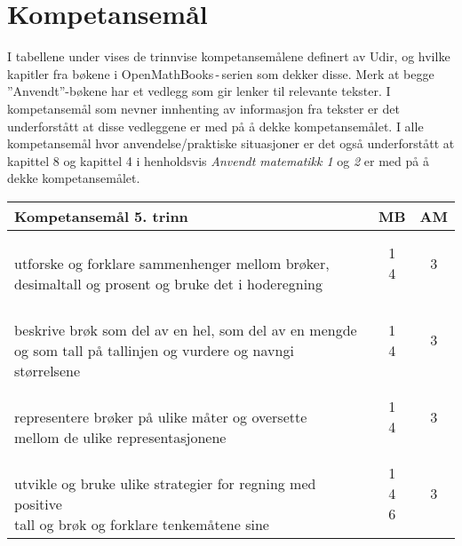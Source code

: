 \documentclass{article}
\begin{document}
\section*{Kompetansemål}
I tabellene under vises de trinnvise kompetansemålene definert av Udir, og hvilke kapitler fra bøkene i OpenMathBooks\,-\,serien som dekker disse. Merk at begge ''Anvendt''-bøkene har et vedlegg som gir lenker til relevante tekster. I kompetansemål som nevner innhenting av informasjon fra tekster er det underforstått at disse vedleggene er med på å dekke kompetansemålet. I alle kompetansemål hvor anvendelse/praktiske situasjoner er det også underforstått at kapittel 8 og kapittel 4 i henholdsvis \textsl{Anvendt matematikk 1} og \textsl{2} er med på å dekke kompetansemålet.
\newpage
\begin{center}
	\begin{tabular}{p{10.5cm} | c | c |} 
	\textbf{Kompetansemål 5. trinn} & \textbf{MB} & \textbf{AM}\\ \hline
\shortstack[l]{\\utforske og forklare sammenhenger mellom brøker,\\ desimaltall og prosent og bruke det i hoderegning} &\shortstack{1 \\4} &\shortstack{3\\{}} \\ \hline
	
\shortstack[l]{\\beskrive brøk som del av en hel, som del av en mengde\\ og som tall på tallinjen og vurdere og navngi størrelsene} &\shortstack{1\\4} &\shortstack{3\\{}} \\ \hline

\shortstack[l]{\\representere brøker på ulike måter og oversette\\ mellom de ulike representasjonene
} &\shortstack{1 \\4} &\shortstack{3\\{}} \\ \hline

\shortstack[l]{\\utvikle og bruke ulike strategier for regning med positive \\tall og brøk og forklare tenkemåtene sine \\{}
} &\shortstack{1\\4\\6} &\shortstack{3\\{}} \\ \hline	


\end{tabular}
\end{center}
\end{document}
